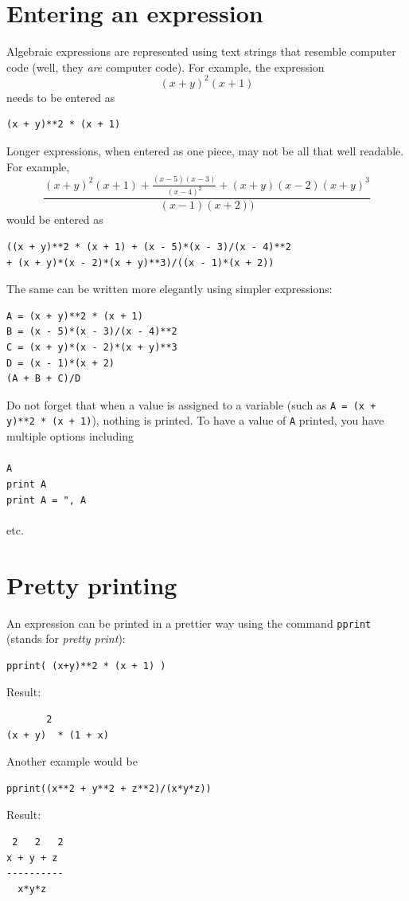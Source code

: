 \documentclass{article}
\begin{document}
\section{Entering an expression}
Algebraic expressions are represented using text strings that resemble 
computer code (well, they {\em are} computer code). For example, the expression 
$$
  (x + y)^2 (x + 1)
$$ 
needs to be entered as
\begin{verbatim}
(x + y)**2 * (x + 1)
\end{verbatim}
Longer expressions, when entered as one piece, may not be all that well readable. For example,
$$
\frac{(x + y)^2 (x + 1) + \frac{(x-5)(x-3)}{(x-4)^2} + (x + y)(x - 2)(x + y)^3}{(x-1)(x+2))}
$$ 
would be entered as 
\begin{verbatim}
((x + y)**2 * (x + 1) + (x - 5)*(x - 3)/(x - 4)**2 
+ (x + y)*(x - 2)*(x + y)**3)/((x - 1)*(x + 2))
\end{verbatim}
The same can be written more elegantly using simpler expressions:
\begin{verbatim}
A = (x + y)**2 * (x + 1)
B = (x - 5)*(x - 3)/(x - 4)**2
C = (x + y)*(x - 2)*(x + y)**3
D = (x - 1)*(x + 2)
(A + B + C)/D
\end{verbatim}
Do not forget that when a value is assigned to a variable (such as {\tt A = (x + y)**2 * (x + 1)}), nothing
is printed. To have a value of {\tt A} printed, you have multiple options including\\
\\
{\tt A}\\
{\tt print A}\\
{\tt print A = ", A}\\
\\
etc.

\section{Pretty printing}
An expression can be printed in a prettier way using the command {\tt pprint} (stands for {\em pretty print}):
\begin{verbatim}
pprint( (x+y)**2 * (x + 1) )
\end{verbatim}
Result:
\begin{verbatim}
       2
(x + y)  * (1 + x)
\end{verbatim}
Another example would be
\begin{verbatim}
pprint((x**2 + y**2 + z**2)/(x*y*z))
\end{verbatim}
Result:
\begin{verbatim}
 2   2   2
x + y + z
----------
  x*y*z   
\end{verbatim}
\end{document}
